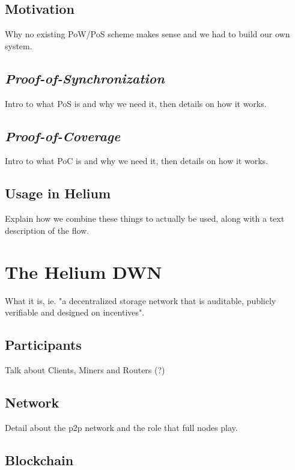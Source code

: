 \documentclass[a4paper,12pt]{article}
\begin{document}
\subsection{Motivation}

Why no existing PoW/PoS scheme makes sense and we had to build our own system.

\subsection{\textit{Proof-of-Synchronization}}

Intro to what PoS is and why we need it, then details on how it works.

\subsection{\textit{Proof-of-Coverage}}

Intro to what PoC is and why we need it, then details on how it works.

\subsection{Usage in Helium}

Explain how we combine these things to actually be used, along with a text description of the flow.

\section{The Helium DWN}

What it is, ie. "a decentralized storage network that is auditable, publicly verifiable and designed on incentives".

\subsection{Participants}

Talk about Clients, Miners and Routers (?)

\subsection{Network}

Detail about the p2p network and the role that full nodes play.

\subsection{Blockchain}
\end{document}
